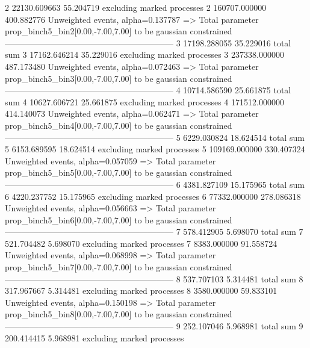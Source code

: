 2          22130.609663    55.204719       excluding marked processes    
2          160707.000000   400.882776      Unweighted events, alpha=0.137787
  => Total parameter prop_binch5_bin2[0.00,-7.00,7.00] to be gaussian constrained
------------------------------------------------------------
3          17198.288055    35.229016       total sum                     
3          17162.646214    35.229016       excluding marked processes    
3          237338.000000   487.173480      Unweighted events, alpha=0.072463
  => Total parameter prop_binch5_bin3[0.00,-7.00,7.00] to be gaussian constrained
------------------------------------------------------------
4          10714.586590    25.661875       total sum                     
4          10627.606721    25.661875       excluding marked processes    
4          171512.000000   414.140073      Unweighted events, alpha=0.062471
  => Total parameter prop_binch5_bin4[0.00,-7.00,7.00] to be gaussian constrained
------------------------------------------------------------
5          6229.030824     18.624514       total sum                     
5          6153.689595     18.624514       excluding marked processes    
5          109169.000000   330.407324      Unweighted events, alpha=0.057059
  => Total parameter prop_binch5_bin5[0.00,-7.00,7.00] to be gaussian constrained
------------------------------------------------------------
6          4381.827109     15.175965       total sum                     
6          4220.237752     15.175965       excluding marked processes    
6          77332.000000    278.086318      Unweighted events, alpha=0.056663
  => Total parameter prop_binch5_bin6[0.00,-7.00,7.00] to be gaussian constrained
------------------------------------------------------------
7          578.412905      5.698070        total sum                     
7          521.704482      5.698070        excluding marked processes    
7          8383.000000     91.558724       Unweighted events, alpha=0.068998
  => Total parameter prop_binch5_bin7[0.00,-7.00,7.00] to be gaussian constrained
------------------------------------------------------------
8          537.707103      5.314481        total sum                     
8          317.967667      5.314481        excluding marked processes    
8          3580.000000     59.833101       Unweighted events, alpha=0.150198
  => Total parameter prop_binch5_bin8[0.00,-7.00,7.00] to be gaussian constrained
------------------------------------------------------------
9          252.107046      5.968981        total sum                     
9          200.414415      5.968981        excluding marked processes    
